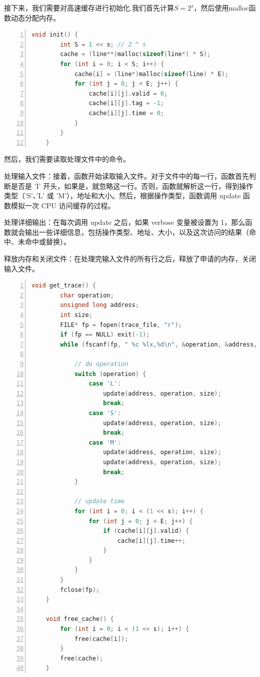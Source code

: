 \documentclass{article}
\begin{document}
接下来，我们需要对高速缓存进行初始化.我们首先计算$S = 2 ^ s$，然后使用malloc函数动态分配内存。

\begin{lstlisting}[xleftmargin = 4em,xrightmargin = 4em, aboveskip = 1em, numbers = left, language = C]
    void init() {
        int S = 1 << s; // 2 ^ s
        cache = (line**)malloc(sizeof(line*) * S);
        for (int i = 0; i < S; i++) {
            cache[i] = (line*)malloc(sizeof(line) * E);
            for (int j = 0; j < E; j++) {
                cache[i][j].valid = 0;
                cache[i][j].tag = -1;
                cache[i][j].time = 0;
            }
        }
    }
\end{lstlisting}

然后，我们需要读取处理文件中的命令。

处理输入文件：接着，函数开始读取输入文件。对于文件中的每一行，函数首先判断是否是 'I' 开头，如果是，就忽略这一行。否则，函数就解析这一行，得到操作类型（'S'、'L' 或 'M'），地址和大小。然后，根据操作类型，函数调用 update 函数模拟一次 CPU 访问缓存的过程。

处理详细输出：在每次调用 update 之后，如果 verbose 变量被设置为 1，那么函数就会输出一些详细信息，包括操作类型、地址、大小，以及这次访问的结果（命中、未命中或替换）。

释放内存和关闭文件：在处理完输入文件的所有行之后，释放了申请的内存，关闭输入文件。

\begin{lstlisting}[xleftmargin = 4em,xrightmargin = 4em, aboveskip = 1em, numbers = left, language = C]
    void get_trace() {
        char operation;
        unsigned long address;
        int size;
        FILE* fp = fopen(trace_file, "r");
        if (fp == NULL) exit(-1);
        while (fscanf(fp, " %c %lx,%d\n", &operation, &address, &size) > 0) {

            // do operation
            switch (operation) {
                case 'L':
                    update(address, operation, size);
                    break;
                case 'S':
                    update(address, operation, size);
                    break;
                case 'M':
                    update(address, operation, size);
                    update(address, operation, size);
                    break;
            }

            // update time
            for (int i = 0; i < (1 << s); i++) {
                for (int j = 0; j < E; j++) {
                    if (cache[i][j].valid) {
                        cache[i][j].time++;
                    }
                }
            }
        }
        fclose(fp);
    }

    void free_cache() {
        for (int i = 0; i < (1 << s); i++) {
            free(cache[i]);
        }
        free(cache);
    }
\end{lstlisting}
\end{document}
